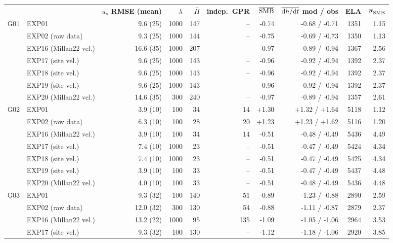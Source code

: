 \begin{tabular}{llrrrrrrrr}
\toprule
 & & $u_s$ RMSE (mean) & $\lambda$ & $\overline{H}$ & indep.\ GPR & $\overline{\rm SMB}$ & $\overline{{\rm d}h/{\rm d}t}$ mod / obs & ELA & $\overline{\sigma}_{\rm SMB}$ \\
\midrule
G01 & EXP01 & 9.6 (25) & 1000 & 147 & -- & -0.74 & -0.68 / -0.71 & 1351 & 1.15 \\
 & EXP02 (raw data) & 9.3 (25) & 1000 & 144 & -- & -0.75 & -0.69 / -0.73 & 1350 & 1.13 \\
 & EXP16 (Millan22 vel.) & 16.6 (35) & 1000 & 207 & -- & -0.97 & -0.89 / -0.94 & 1367 & 2.56 \\
 & EXP17 (site vel.) & 9.6 (25) & 1000 & 143 & -- & -0.96 & -0.92 / -0.94 & 1392 & 2.37 \\
 & EXP18 (site vel.) & 9.6 (25) & 1000 & 143 & -- & -0.96 & -0.92 / -0.94 & 1392 & 2.37 \\
 & EXP19 (site vel.) & 9.6 (25) & 1000 & 143 & -- & -0.96 & -0.92 / -0.94 & 1392 & 2.37 \\
 & EXP20 (Millan22 vel.) & 14.6 (35) & 300 & 240 & -- & -0.97 & -0.89 / -0.94 & 1357 & 2.61 \\
\midrule
G02 & EXP01 & 3.9 (10) & 100 & 34 & 14 & +1.30 & +1.32 / +1.64 & 5118 & 1.12 \\
 & EXP02 (raw data) & 6.3 (10) & 100 & 28 & 20 & +1.23 & +1.23 / +1.62 & 5116 & 1.20 \\
 & EXP16 (Millan22 vel.) & 3.9 (10) & 100 & 34 & 14 & -0.51 & -0.48 / -0.49 & 5436 & 4.49 \\
 & EXP17 (site vel.) & 7.4 (10) & 1000 & 23 & -- & -0.51 & -0.47 / -0.49 & 5424 & 4.34 \\
 & EXP18 (site vel.) & 7.4 (10) & 1000 & 23 & -- & -0.51 & -0.47 / -0.49 & 5425 & 4.34 \\
 & EXP19 (site vel.) & 3.9 (10) & 100 & 33 & -- & -0.51 & -0.47 / -0.49 & 5437 & 4.48 \\
 & EXP20 (Millan22 vel.) & 4.0 (10) & 100 & 33 & -- & -0.51 & -0.48 / -0.49 & 5436 & 4.48 \\
\midrule
G03 & EXP01 & 9.3 (32) & 100 & 140 & 51 & -0.89 & -1.23 / -0.88 & 2890 & 2.59 \\
 & EXP02 (raw data) & 12.0 (32) & 300 & 130 & 54 & -0.88 & -1.11 / -0.87 & 2879 & 2.37 \\
 & EXP16 (Millan22 vel.) & 13.2 (22) & 1000 & 95 & 135 & -1.09 & -1.05 / -1.06 & 2964 & 3.53 \\
 & EXP17 (site vel.) & 9.3 (32) & 100 & 130 & -- & -1.12 & -1.18 / -1.06 & 2920 & 3.85 \\

\end{tabular}
